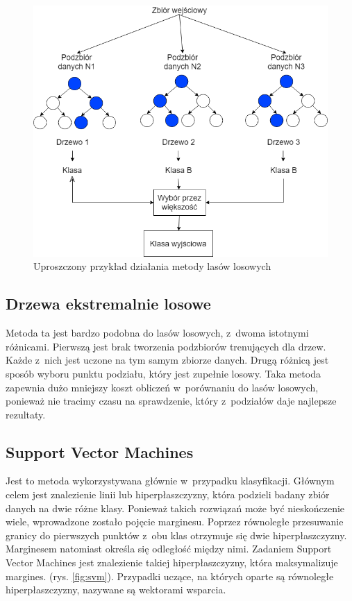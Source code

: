 \begin{figure}
	\centering
	\includegraphics[width=0.7\linewidth]{images/random_forest.png}
	\caption{Uproszczony przykład działania metody lasów losowych}
	\label{fig:random_forest}
\end{figure}

\subsection{Drzewa ekstremalnie losowe} 
Metoda ta jest bardzo podobna do lasów losowych, z~dwoma istotnymi różnicami. Pierwszą jest brak tworzenia podzbiorów trenujących dla drzew. Każde z~nich jest uczone na tym samym zbiorze danych. Drugą różnicą jest sposób wyboru punktu podziału, który jest zupełnie losowy. Taka metoda zapewnia dużo mniejszy koszt obliczeń w~porównaniu do lasów losowych, ponieważ nie tracimy czasu na sprawdzenie, który z~podziałów daje najlepsze rezultaty.

\subsection{Support Vector Machines} 
Jest to metoda wykorzystywana głównie w~przypadku klasyfikacji. Głównym celem jest znalezienie linii lub hiperpłaszczyzny, która podzieli badany zbiór danych na dwie różne klasy. Ponieważ takich rozwiązań może być nieskończenie wiele, wprowadzone zostało pojęcie marginesu. Poprzez równoległe przesuwanie granicy do pierwszych punktów z~obu klas otrzymuje się dwie hiperpłaszczyzny. Marginesem natomiast określa się odległość między nimi. Zadaniem Support Vector Machines jest znalezienie takiej hiperpłaszczyzny, która maksymalizuje margines. (rys. \ref{fig:svm}). Przypadki uczące, na których oparte są równoległe hiperpłaszczyzny, nazywane są wektorami wsparcia.

